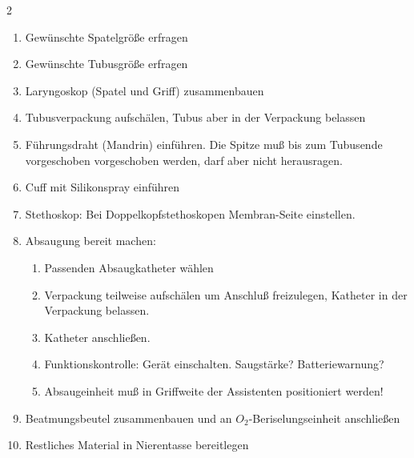 \begin{multicols}{2}


\begin{enumerate}
    \item Gewünschte Spatelgröße erfragen
    \item Gewünschte Tubusgröße erfragen
    \item Laryngoskop (Spatel und Griff) zusammenbauen
    \item Tubusverpackung aufschälen, Tubus aber in der Verpackung belassen
    \item Führungsdraht (Mandrin) einführen. Die Spitze muß bis zum Tubusende
    vorgeschoben vorgeschoben werden, darf aber nicht herausragen.
    \item Cuff mit Silikonspray einführen
    \item Stethoskop: Bei Doppelkopfstethoskopen Membran-Seite einstellen.
    \item Absaugung bereit machen:
    \begin{enumerate}
        \item Passenden Absaugkatheter wählen
        \item Verpackung teilweise aufschälen um Anschluß freizulegen, Katheter
        in der Verpackung belassen.
        \item Katheter anschließen.
        \item Funktionskontrolle: Gerät einschalten. Saugstärke?
        Batteriewarnung?
\item Absaugeinheit muß in Griffweite der Assistenten positioniert werden! 
    \end{enumerate}
    \item Beatmungsbeutel zusammenbauen und an $O_2$-Beriselungseinheit
    anschließen
    \item Restliches Material in Nierentasse bereitlegen
\end{enumerate}
\end{multicols}

